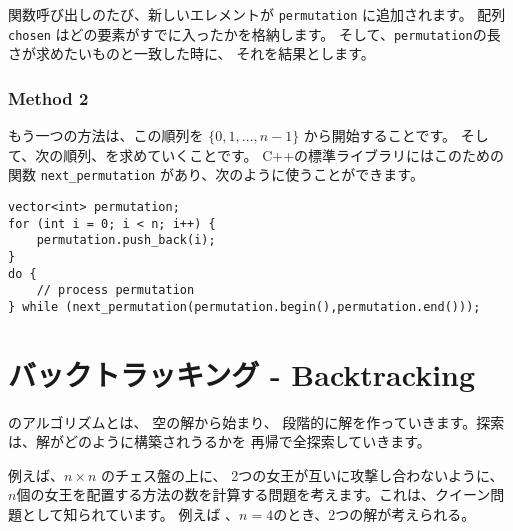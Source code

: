 関数呼び出しのたび、新しいエレメントが
\texttt{permutation}
に追加されます。
配列\texttt{chosen} はどの要素がすでに入ったかを格納します。
そして、\texttt{permutation}の長さが求めたいものと一致した時に、
それを結果とします。

\subsubsection{Method 2}


もう一つの方法は、この順列を
$\{0,1,\ldots,n-1\}$ から開始することです。
そして、次の順列、を求めていくことです。
C++の標準ライブラリにはこのための関数
\texttt{next\_permutation} があり、次のように使うことができます。

\begin{lstlisting}
vector<int> permutation;
for (int i = 0; i < n; i++) {
    permutation.push_back(i);
}
do {
    // process permutation
} while (next_permutation(permutation.begin(),permutation.end()));
\end{lstlisting}

\section{バックトラッキング - Backtracking}


 のアルゴリズムとは、
空の解から始まり、
段階的に解を作っていきます。探索は、解がどのように構築されうるかを
再帰で全探索していきます。


例えば、$n \times n$ のチェス盤の上に、
2つの女王が互いに攻撃し合わないように、
$n$個の女王を配置する方法の数を計算する問題を考えます。これは、クイーン問題として知られています。
例えば 、$n=4$のとき、2つの解が考えられる。

\begin{center}
\end{center}

